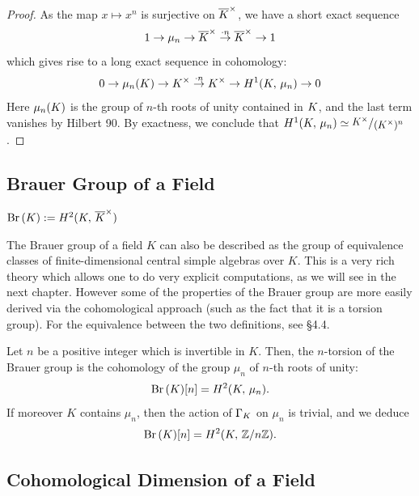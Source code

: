 \documentclass[a4paper, oneside]{memoir}
\begin{document}
\begin{proof}
	As the map $x\mapsto x^n$ is surjective on $\overline{K}^\times$, we have a short exact sequence
	\[
		1\to \mu_n\to \overline{K}^\times\overset{\cdot n}{\to} \overline{K}^\times\to 1
	\]
	which gives rise to a long exact sequence in cohomology:
	\[
		0\to \mu_n(K)\to K^\times \overset{\cdot n}{\to} K^\times \to H^{1}( K, \, \mu_n )\to 0
	\]
	Here $\mu_n(K)$ is the group of $n$-th roots of unity contained in $K$, and the last term vanishes by Hilbert 90. By exactness, we conclude that $\H{1}{\K}{\mu_n}\simeq \sfrac{\K^\times}{(\K^\times)^n}$.
\end{proof}


\subsection{Brauer Group of a Field}

\begin{definition}
	$\operatorname{Br}{(K)}:=H^{2}( K, \, \overline{K}^\times )$
\end{definition}

\begin{remark}\label{rm:CSA}
	The Brauer group of a field $K$ can also be described as the group of equivalence classes of finite-dimensional central simple algebras over $K$. This is a very rich theory which allows one to do very explicit computations, as we will see in the next chapter. However some of the properties of the Brauer group are more easily derived via the cohomological approach (such as the fact that it is a torsion group). For the equivalence between the two definitions, see \cite{SzamuelyGille} \S 4.4.
\end{remark}

\begin{proposition}\label{prop:BrMuN}
	Let $n$ be a positive integer which is invertible in $K$. Then, the $n$-torsion of the Brauer group is the cohomology of the group $\mu_n$ of $n$-th roots of unity:
	\[
		\operatorname{Br}{(K)}[n]=H^{2}( K, \, \mu_n ).
	\]
	If moreover $K$ contains $\mu_n$, then the action of $\Gamma_K$ on $\mu_n$ is trivial, and we deduce
	\[
		\operatorname{Br}{(K)}[n]=H^{2}( K, \, \mathbb{Z}/n\mathbb{Z} ).
	\]
\end{proposition}

\subsection{Cohomological Dimension of a Field}
\end{document}

